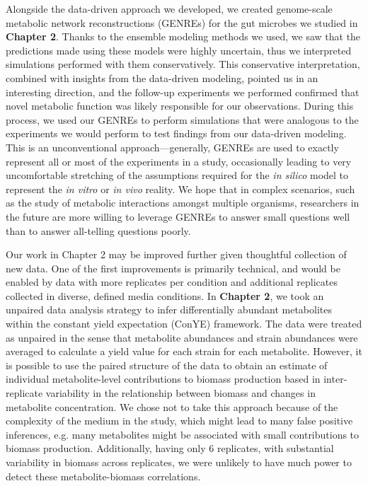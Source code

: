 \documentclass[11pt,twocolumn,notitlepage,openany,twoside]{book}
\begin{document}
\begin{refsection}
Alongside the data-driven approach we developed, we created genome-scale metabolic network reconstructions (GENREs) for the gut microbes we studied in \textbf{Chapter 2}. Thanks to the ensemble modeling methods we used, we saw that the predictions made using these models were highly uncertain, thus we interpreted simulations performed with them conservatively. This conservative interpretation, combined with insights from the data-driven modeling, pointed us in an interesting direction, and the follow-up experiments we performed confirmed that novel metabolic function was likely responsible for our observations. During this process, we used our GENREs to perform simulations that were analogous to the experiments we would perform to test findings from our data-driven modeling. This is an unconventional approach---generally, GENREs are used to exactly represent all or most of the experiments in a study, occasionally leading to very uncomfortable stretching of the assumptions required for the \textit{in silico} model to represent the \textit{in vitro} or \textit{in vivo} reality. We hope that in complex scenarios, such as the study of metabolic interactions amongst multiple organisms, researchers in the future are more willing to leverage GENREs to answer small questions well than to answer all-telling questions poorly.

Our work in Chapter 2 may be improved further given thoughtful collection of new data. One of the first improvements is primarily technical, and would be enabled by data with more replicates per condition and additional replicates collected in diverse, defined media conditions. In \textbf{Chapter 2}, we took an unpaired data analysis strategy to infer differentially abundant metabolites within the constant yield expectation (ConYE) framework. The data were treated as unpaired in the sense that metabolite abundances and strain abundances were averaged to calculate a yield value for each strain for each metabolite. However, it is possible to use the paired structure of the data to obtain an estimate of individual metabolite-level contributions to biomass production based in inter-replicate variability in the relationship between biomass and changes in metabolite concentration. We chose not to take this approach because of the complexity of the medium in the study, which might lead to many false positive inferences, e.g. many metabolites might be associated with small contributions to biomass production. Additionally, having only 6 replicates, with substantial variability in biomass across replicates, we were unlikely to have much power to detect these metabolite-biomass correlations.


\end{refsection}
\end{document}
